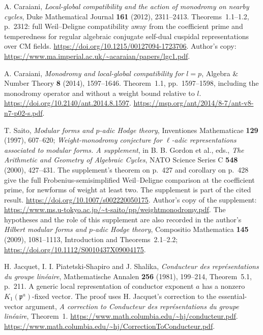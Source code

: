 A. Caraiani, \emph{Local-global compatibility and the action of
monodromy on nearby cycles}, Duke Mathematical Journal
\textbf{161} (2012), 2311--2413.  Theorems~1.1--1.2,
p.~2312: full Weil--Deligne compatibility away from the
coefficient prime and temperedness for regular algebraic
conjugate self-dual cuspidal representations over CM fields.
\url{https://doi.org/10.1215/00127094-1723706}.
Author's copy: \url{https://www.ma.imperial.ac.uk/~acaraian/papers/lgc1.pdf}.

A. Caraiani, \emph{Monodromy and local-global compatibility for
$l=p$}, Algebra \& Number Theory \textbf{8} (2014),
1597--1646.  Theorem~1.1, pp.~1597--1598, including the
monodromy operator and without a weight bound relative to $l$.
\url{https://doi.org/10.2140/ant.2014.8.1597}.
\url{https://msp.org/ant/2014/8-7/ant-v8-n7-p02-s.pdf}.

T. Saito, \emph{Modular forms and $p$-adic Hodge theory},
Inventiones Mathematicae \textbf{129} (1997), 607--620;
\emph{Weight-monodromy conjecture for $\ell$-adic representations
associated to modular forms. A supplement}, in
B. B. Gordon et al., eds., \emph{The Arithmetic and Geometry of
Algebraic Cycles}, NATO Science Series C \textbf{548} (2000),
427--431.  The supplement's theorem on p.~427 and corollary
on p.~428 give the full Frobenius-semisimplified Weil--Deligne
comparison at the coefficient prime, for newforms of weight
at least two.  The supplement is part of the cited result.
\url{https://doi.org/10.1007/s002220050175}.
Author's copy of the supplement:
\url{https://www.ms.u-tokyo.ac.jp/~t-saito/pp/weightmonodromy.pdf}.
The hypotheses and the role of this supplement are also
recorded in the author's \emph{Hilbert modular forms and
$p$-adic Hodge theory}, Compositio Mathematica
\textbf{145} (2009), 1081--1113, Introduction and
Theorems~2.1--2.2; \url{https://doi.org/10.1112/S0010437X09004175}.

H. Jacquet, I. I. Piatetski-Shapiro and J. Shalika,
\emph{Conducteur des repr\'esentations du groupe lin\'eaire},
Mathematische Annalen \textbf{256} (1981), 199--214,
Theorem~5.1, p.~211.  A generic local representation of
conductor exponent $a$ has a nonzero $K_1(\mathfrak p^a)$-fixed
vector.  The proof uses H. Jacquet's correction to the
essential-vector argument, \emph{A correction to Conducteur
des repr\'esentations du groupe lin\'eaire}, Theorem~1.
\url{https://www.math.columbia.edu/~hj/conducteur.pdf}.
\url{https://www.math.columbia.edu/~hj/CorrectionToConducteur.pdf}.

